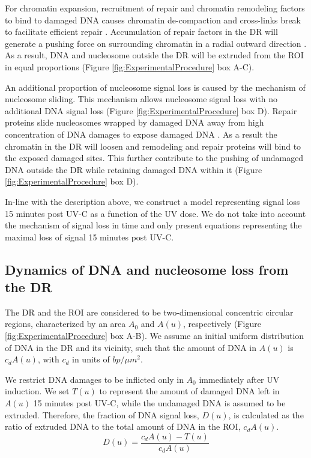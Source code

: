 \documentclass[12pt]{article}
\begin{document}
	For chromatin expansion, recruitment of repair and chromatin remodeling factors to bind to damaged DNA causes chromatin de-compaction and cross-links break to facilitate efficient repair \cite{gaillard2003chromatin,luijsterburg2012ddb2,deem2012epigenetic}. Accumulation of repair factors in the DR will generate a pushing force on surrounding chromatin in a radial outward direction \cite{dinant2007activation}. As a result, DNA and nucleosome outside the DR will be extruded from the ROI in equal proportions (Figure \ref{fig:ExperimentalProcedure} box A-C).
	
	An additional proportion of nucleosome signal loss is caused by the mechanism of nucleosome sliding. This mechanism allows nucleosome signal loss with no additional DNA signal loss (Figure \ref{fig:ExperimentalProcedure} box D). Repair proteins slide nucleosomes wrapped by damaged DNA away from high concentration of DNA damages to expose damaged DNA \cite{gaillard2003chromatin}. As a result the chromatin in the DR will loosen and remodeling and repair proteins will bind to the exposed damaged sites. This further contribute to the pushing of undamaged DNA outside the DR while retaining damaged DNA within it (Figure \ref{fig:ExperimentalProcedure} box D).  

    In-line with the description above, we construct a model representing
	signal loss 15 minutes post UV-C as a function of the UV dose. We do not take into account the
	mechanism of signal loss in time and only present equations representing the maximal loss of signal 15 minutes post UV-C.
	

	\subsection{Dynamics of DNA and nucleosome loss from the DR}
	The DR and the ROI are considered to be two-dimensional concentric circular regions, characterized by an area $A_0$ and $A(u)$, respectively (Figure \ref{fig:ExperimentalProcedure} box A-B). We assume an initial uniform distribution of DNA in the DR and its vicinity, such that the amount of DNA in $A(u)$ is $c_dA(u)$, with $c_d$ in units of $bp/\mu m^2$. 
	
	We restrict DNA damages to be inflicted only in $A_0$ immediately after UV induction. We set $T(u)$ to represent the amount of damaged DNA left in $A(u)$ 15 minutes post UV-C, while the undamaged DNA is assumed to be extruded. Therefore, the fraction of DNA signal loss, $D(u)$, is calculated as the ratio of extruded DNA to the total amount of DNA in the ROI, $c_dA(u)$. 
	\begin{equation}\label{eq:DNALossFraction}
	D(u) = \frac{c_dA(u)- T(u)}{c_dA(u)}
	\end{equation}
	
\end{document}

